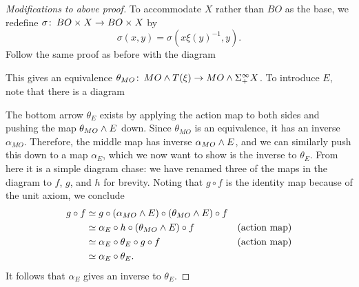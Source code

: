 \begin{proof}[Modifications to above proof]
To accommodate $X$ rather than $BO$ as the base, we redefine $\sigma\colon\thinspace BO \times X \to BO \times X$ by \[\sigma(x, y) = \sigma(x \xi(y)^{-1}, y).\]  Follow the same proof as before with the diagram
\begin{center}
\end{center}
This gives an equivalence $\theta_{MO}\colon\thinspace MO \wedge T(\xi) \rightarrow MO \wedge \Sigma^\infty_+ X$.  To introduce $E$, note that there is a diagram
\begin{center}
\end{center}
The bottom arrow $\theta_E$ exists by applying the action map to both sides and pushing the map $\theta_{MO} \wedge E$ down.  Since $\theta_{MO}$ is an equivalence, it has an inverse $\alpha_{MO}$.  Therefore, the middle map has inverse $\alpha_{MO} \wedge E$, and we can similarly push this down to a map $\alpha_E$, which we now want to show is the inverse to $\theta_E$.  From here it is a simple diagram chase: we have renamed three of the maps in the diagram to $f$, $g$, and $h$ for brevity.  Noting that $g \circ f$ is the identity map because of the unit axiom, we conclude
\begin{align*}
g \circ f & \simeq g \circ (\alpha_{MO} \wedge E) \circ (\theta_{MO} \wedge E) \circ f \\
& \simeq \alpha_E \circ h \circ (\theta_{MO}\wedge E) \circ f & \text{(action map)} \\
& \simeq \alpha_E \circ \theta_E \circ g \circ f & \text{(action map)} \\
& \simeq \alpha_E \circ \theta_E.
\end{align*}
It follows that $\alpha_E$ gives an inverse to $\theta_E$.
\end{proof}

